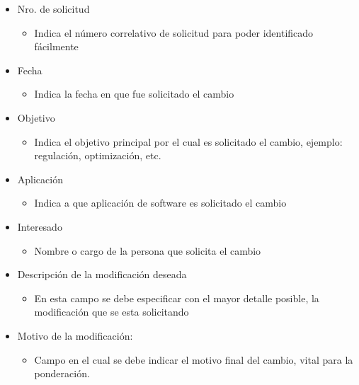 \begin{itemize}
    \item Nro. de solicitud
    \begin{itemize}
        \item Indica el número correlativo de solicitud para poder identificado fácilmente
    \end{itemize}
    \item Fecha
    \begin{itemize}
        \item Indica la fecha en que fue solicitado el cambio
    \end{itemize}
    \item Objetivo
    \begin{itemize}
        \item Indica el objetivo principal por el cual es solicitado el cambio, ejemplo: regulación, optimización, etc.
    \end{itemize}
    \item Aplicación
    \begin{itemize}
        \item Indica a que aplicación de software es solicitado el cambio
    \end{itemize}
    \item Interesado
    \begin{itemize}
        \item Nombre o cargo de la persona que solicita el cambio
    \end{itemize}
    \item Descripción de la modificación deseada
    \begin{itemize}
        \item En esta campo se debe especificar con el mayor detalle posible, la modificación que se esta solicitando
    \end{itemize}
    \item Motivo de la modificación:
    \begin{itemize}
        \item Campo en el cual se debe indicar el motivo final del cambio, vital para la ponderación.
    \end{itemize}
\end{itemize}

